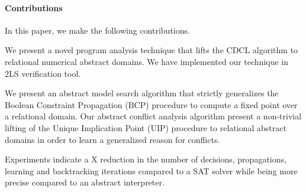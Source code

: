 \paragraph{Contributions}
In this paper, we make the following contributions.
\begin{compactenum}
\item We present a novel program analysis technique that 
lifts the CDCL algorithm to relational numerical abstract domains.   
We have implemented our technique in 2LS verification tool.  

\item We present an abstract model search algorithm that strictly 
generalizes the Boolean Constraint Propagation (BCP) procedure to
compute a fixed point over a relational domain.  Our abstract 
conflict analysis algorithm present a non-trivial lifting of the 
Unique Implication Point (UIP) procedure to relational abstract 
domains in order to learn a generalized reason for conflicts.  
 
\item  Experiments indicate a X reduction in the number of 
decisions, propagations, learning and backtracking iterations compared to a 
SAT solver while being more precise compared to an abstract interpreter.  
\end{compactenum}
